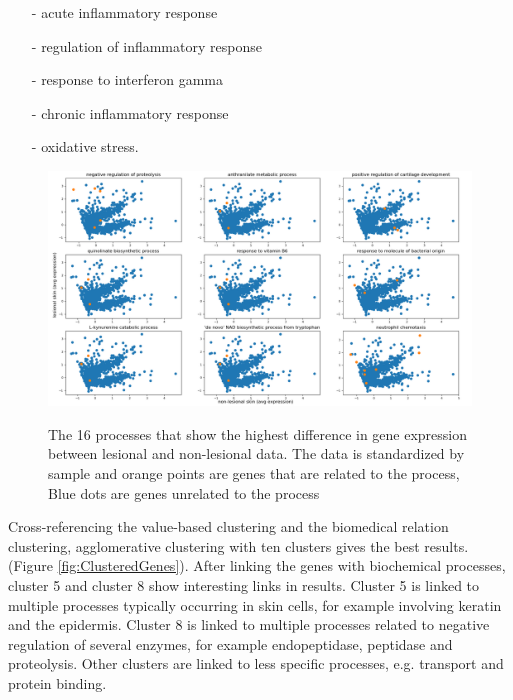 \documentclass[10pt,a4paper]{article}
\begin{document}
	\begin{enumerate}
		\item[-] acute inflammatory response
		\item[-] regulation of inflammatory response 
		\item[-] response to interferon gamma 
		\item[-] chronic inflammatory response
		\item[-] oxidative stress.
	\end{enumerate}
	
	\begin{figure}[H]
	\includegraphics[width=1\textwidth]{Sign_Processes_Psoriasis3x3.png}
	\label{fig:ProcessesScaledBySample}
	\caption{The 16 processes that show the highest difference in gene expression between lesional and non-lesional data. The data is standardized by sample and orange points are genes that are related to the process, Blue dots are genes unrelated to the process}
\end{figure}	
	
	Cross-referencing the value-based clustering and the biomedical relation clustering, agglomerative clustering with ten clusters gives the best results.(Figure \ref{fig:ClusteredGenes}). After linking the genes with biochemical processes, cluster 5 and cluster 8 show interesting links in results. Cluster 5 is linked to multiple processes typically occurring in skin cells, for example involving keratin and the epidermis. Cluster 8 is linked to multiple processes related to negative regulation of several enzymes, for example endopeptidase, peptidase and proteolysis. Other clusters are linked to less specific processes, e.g. transport and protein binding.
	
\end{document}
